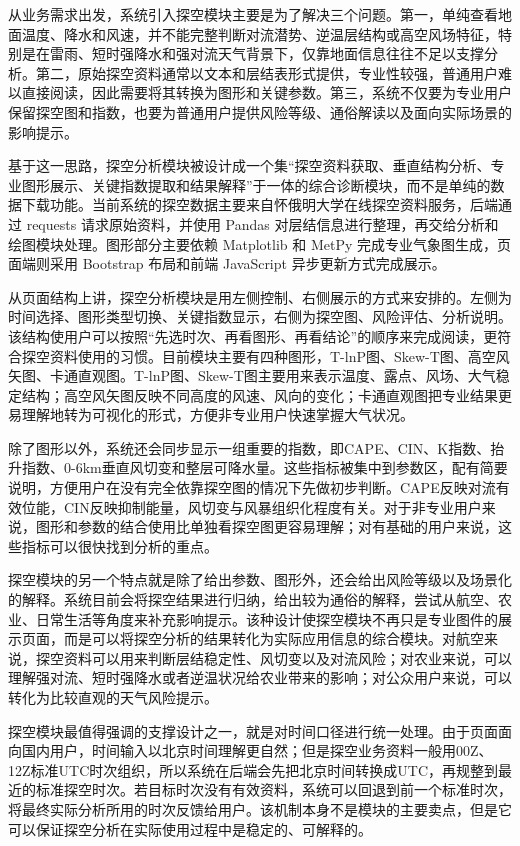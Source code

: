 从业务需求出发，系统引入探空模块主要是为了解决三个问题。第一，单纯查看地面温度、降水和风速，并不能完整判断对流潜势、逆温层结构或高空风场特征，特别是在雷雨、短时强降水和强对流天气背景下，仅靠地面信息往往不足以支撑分析。第二，原始探空资料通常以文本和层结表形式提供，专业性较强，普通用户难以直接阅读，因此需要将其转换为图形和关键参数。第三，系统不仅要为专业用户保留探空图和指数，也要为普通用户提供风险等级、通俗解读以及面向实际场景的影响提示。

基于这一思路，探空分析模块被设计成一个集“探空资料获取、垂直结构分析、专业图形展示、关键指数提取和结果解释”于一体的综合诊断模块，而不是单纯的数据下载功能。当前系统的探空数据主要来自怀俄明大学在线探空资料服务，后端通过 requests 请求原始资料，并使用 Pandas 对层结信息进行整理，再交给分析和绘图模块处理。图形部分主要依赖 Matplotlib 和 MetPy 完成专业气象图生成，页面端则采用 Bootstrap 布局和前端 JavaScript 异步更新方式完成展示。

从页面结构上讲，探空分析模块是用左侧控制、右侧展示的方式来安排的。左侧为时间选择、图形类型切换、关键指数显示，右侧为探空图、风险评估、分析说明。该结构使用户可以按照“先选时次、再看图形、再看结论”的顺序来完成阅读，更符合探空资料使用的习惯。目前模块主要有四种图形，T-lnP图、Skew-T图、高空风矢图、卡通直观图。T-lnP图、Skew-T图主要用来表示温度、露点、风场、大气稳定结构；高空风矢图反映不同高度的风速、风向的变化；卡通直观图把专业结果更易理解地转为可视化的形式，方便非专业用户快速掌握大气状况。

除了图形以外，系统还会同步显示一组重要的指数，即CAPE、CIN、K指数、抬升指数、0-6km垂直风切变和整层可降水量。这些指标被集中到参数区，配有简要说明，方便用户在没有完全依靠探空图的情况下先做初步判断。CAPE反映对流有效位能，CIN反映抑制能量，风切变与风暴组织化程度有关。对于非专业用户来说，图形和参数的结合使用比单独看探空图更容易理解；对有基础的用户来说，这些指标可以很快找到分析的重点。

探空模块的另一个特点就是除了给出参数、图形外，还会给出风险等级以及场景化的解释。系统目前会将探空结果进行归纳，给出较为通俗的解释，尝试从航空、农业、日常生活等角度来补充影响提示。该种设计使探空模块不再只是专业图件的展示页面，而是可以将探空分析的结果转化为实际应用信息的综合模块。对航空来说，探空资料可以用来判断层结稳定性、风切变以及对流风险；对农业来说，可以理解强对流、短时强降水或者逆温状况给农业带来的影响；对公众用户来说，可以转化为比较直观的天气风险提示。

探空模块最值得强调的支撑设计之一，就是对时间口径进行统一处理。由于页面面向国内用户，时间输入以北京时间理解更自然；但是探空业务资料一般用00Z、12Z标准UTC时次组织，所以系统在后端会先把北京时间转换成UTC，再规整到最近的标准探空时次。若目标时次没有有效资料，系统可以回退到前一个标准时次，将最终实际分析所用的时次反馈给用户。该机制本身不是模块的主要卖点，但是它可以保证探空分析在实际使用过程中是稳定的、可解释的。

